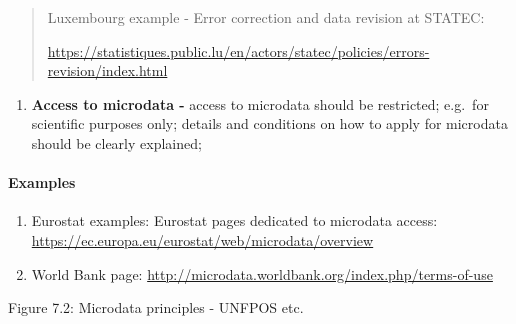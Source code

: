 \documentclass[
]{article}
\providecommand{\tightlist}{%
  \setlength{\itemsep}{0pt}\setlength{\parskip}{0pt}}
\begin{document}
\begin{quote}
Luxembourg example - Error correction and data revision at STATEC:

\url{https://statistiques.public.lu/en/actors/statec/policies/errors-revision/index.html}
\end{quote}

\begin{enumerate}
\def\labelenumi{\arabic{enumi}.}
\setcounter{enumi}{24}
\tightlist
\item
  \textbf{Access to microdata -} access to microdata should be restricted;
  e.g.~for scientific purposes only; details and conditions on how to
  apply for microdata should be clearly explained;
\end{enumerate}

\hypertarget{examples-2}{%
\paragraph{Examples}\label{examples-2}}

\begin{enumerate}
\def\labelenumi{\roman{enumi}.}
\item
  Eurostat examples: Eurostat pages dedicated to microdata access:
  \url{https://ec.europa.eu/eurostat/web/microdata/overview}
\item
  World Bank page:
  \url{http://microdata.worldbank.org/index.php/terms-of-use}
\end{enumerate}

Figure 7.2: Microdata principles - UNFPOS etc.
\end{document}
